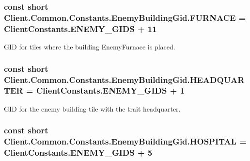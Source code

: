 \subsubsection[{F\+U\+R\+N\+A\+C\+E}]{\setlength{\rightskip}{0pt plus 5cm}const short Client.\+Common.\+Constants.\+Enemy\+Building\+Gid.\+F\+U\+R\+N\+A\+C\+E = {\bf Client\+Constants.\+E\+N\+E\+M\+Y\+\_\+\+G\+I\+D\+S} + 11}\label{classClient_1_1Common_1_1Constants_1_1EnemyBuildingGid_a9ec841522b56d5834bbd691c3e66c97e}


G\+I\+D for tiles where the building Enemy\+Furnace is placed. 

\hypertarget{classClient_1_1Common_1_1Constants_1_1EnemyBuildingGid_a7f6e99d689514ee748d64c65d3244a10}{}
\subsubsection[{H\+E\+A\+D\+Q\+U\+A\+R\+T\+E\+R}]{\setlength{\rightskip}{0pt plus 5cm}const short Client.\+Common.\+Constants.\+Enemy\+Building\+Gid.\+H\+E\+A\+D\+Q\+U\+A\+R\+T\+E\+R = {\bf Client\+Constants.\+E\+N\+E\+M\+Y\+\_\+\+G\+I\+D\+S} + 1}\label{classClient_1_1Common_1_1Constants_1_1EnemyBuildingGid_a7f6e99d689514ee748d64c65d3244a10}


G\+I\+D for the enemy building tile with the trait headquarter. 

\hypertarget{classClient_1_1Common_1_1Constants_1_1EnemyBuildingGid_a32b4b493906c6c811809857ba1763a5e}{}
\subsubsection[{H\+O\+S\+P\+I\+T\+A\+L}]{\setlength{\rightskip}{0pt plus 5cm}const short Client.\+Common.\+Constants.\+Enemy\+Building\+Gid.\+H\+O\+S\+P\+I\+T\+A\+L = {\bf Client\+Constants.\+E\+N\+E\+M\+Y\+\_\+\+G\+I\+D\+S} + 5}\label{classClient_1_1Common_1_1Constants_1_1EnemyBuildingGid_a32b4b493906c6c811809857ba1763a5e}


